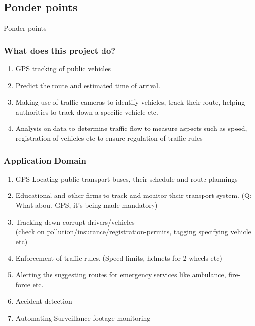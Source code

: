 \documentclass{beamer}
\begin{document}
\subsection{Ponder points}
\begin{frame}
	\Huge{\centerline{Ponder points}}
\end{frame}

\begin{frame}
	\frametitle{What does this project do?}
	\begin{enumerate}
		\item GPS tracking of public vehicles 
		\item Predict the route and estimated time of arrival.
		\item Making use of traffic cameras to identify vehicles, track their route, helping authorities to track down a specific vehicle etc.
		\item Analysis on data to determine traffic flow to measure aspects such as speed, registration of vehicles etc to ensure regulation of traffic rules
	\end{enumerate}
\end{frame}

\begin{frame}
	\frametitle{Application Domain}
	\begin{enumerate}
		\item GPS Locating public transport buses, their schedule and route plannings
		\item Educational and other firms to track and monitor their transport system. (Q: What about GPS, it's being made mandatory)
		\item Tracking down corrupt drivers/vehicles \\(check on pollution/insurance/registration-permits, tagging specifying vehicle etc)
		\item Enforcement of traffic rules. (Speed limits, helmets for 2 wheels etc)
		\item Alerting the suggesting routes for emergency services like ambulance, fire-force etc.
		\item Accident detection
		\item Automating Surveillance footage monitoring
	\end{enumerate}
\end{frame}
\end{document}
